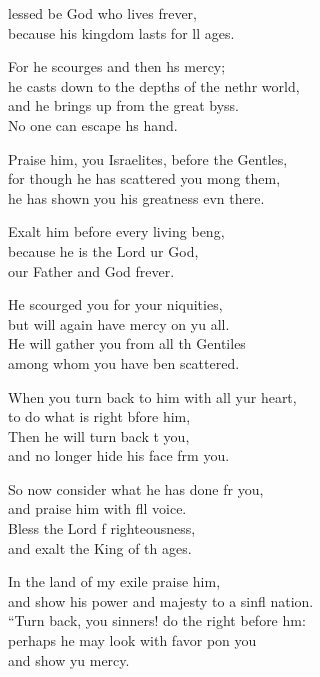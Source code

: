 \settowidth{\versewidth}{“Turn back, you sinners! do the right before him: +}
\begin{psalmverse}%
  \begin{patverse}
    lessed be God who lives frever,\Med\\
    because his kingdom lasts for ll ages.

    For he scourges and then hs mercy;\Med\\
    he casts down to the depths of the nethr world,\\
    and he brings up from the great byss.\Med\\
    No one can escape h\pointup{\i}s hand.

    Praise him, you Israelites, before the Gent\pointup{\i}les,\Flex\\
    for though he has scattered you mong them,\Med\\
    he has shown you his greatness evn there.

    Exalt him before every living be\pointup{\i}ng,\Flex\\
    because he is the Lord ur God,\Med\\
    our Father and God frever.

    He scourged you for your \pointup{\i}niquities,\Med\\
    but will again have mercy on yu all.\\
    He will gather you from all th Gentiles\Med\\
    among whom you have ben scattered.

    When you turn back to him with all yur heart,\Med\\
    to do what is right bfore him,\\
    Then he will turn back t you,\Med\\
    and no longer hide his face frm you.

    So now consider what he has done fr you,\Med\\
    and praise him with fll voice.\\
    Bless the Lord f righteousness,\Med\\
    and exalt the King of th ages.

    In the land of my exile  praise him,\Med\\
    and show his power and majesty to a sinfl nation.\\
    “Turn back, you sinners! do the right before h\pointup{\i}m:\Flex\\
    perhaps he may look with favor pon you\Med\\
    and show yu mercy.


\end{patverse}
\end{psalmverse}
